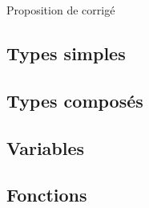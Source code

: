 
\vspace{0.1cm}
\begin{huge}
 Proposition de corrigé
\end{huge}

\subsection{Types simples}
\setcounter{thequestion}{0}
\subsection{Types composés}
\setcounter{thequestion}{0}
\subsection{Variables}
\setcounter{thequestion}{0}
\subsection{Fonctions}
\setcounter{thequestion}{0}
